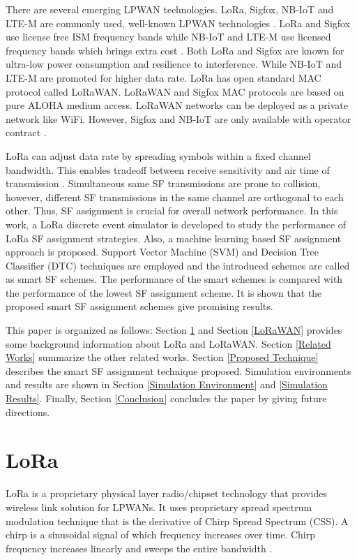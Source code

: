 \documentclass[conference]{IEEEtran}
\begin{document}
\par There are several emerging LPWAN technologies. LoRa, Sigfox, NB-IoT and LTE-M are commonly used, well-known LPWAN technologies \cite{7815384}. LoRa and Sigfox use license free ISM frequency bands while NB-IoT and LTE-M use licensed frequency bands which brings extra cost \cite{7815384}. Both LoRa and Sigfox are known for ultra-low power consumption and resilience to interference. While NB-IoT and LTE-M are promoted for higher data rate. LoRa has open standard MAC protocol called LoRaWAN. LoRaWAN and Sigfox MAC protocols are based on pure ALOHA medium access. LoRaWAN networks can be deployed as a private network like WiFi. However, Sigfox and NB-IoT are only available with operator contract \cite{7815384}.

\par LoRa can adjust data rate by spreading symbols within a fixed channel bandwidth. This enables tradeoff between receive sensitivity and air time of transmission \cite{7803607}. Simultaneous same SF transmissions are prone to collision, however, different SF transmissions in the same channel are orthogonal to each other. Thus, SF assignment is crucial for overall network performance. In this work, a LoRa discrete event simulator is developed to study the performance of LoRa SF assignment strategies. Also, a machine learning based SF assignment approach is proposed. Support Vector Machine (SVM) and Decision Tree Classifier (DTC) techniques are employed and the introduced schemes are called as smart SF schemes. The performance of the smart schemes is compared with the performance of the lowest SF assignment scheme. It is shown that the proposed smart SF assignment schemes give promising results.

\par This paper is organized as follows: Section \ref{LoRa} and Section \ref{LoRaWAN} provides some background information about LoRa and LoRaWAN. Section \ref{Related Works} summarize  the other related works. Section \ref{Proposed Technique} describes the smart SF assignment technique proposed. Simulation environments and results are shown in Section \ref{Simulation Environment} and \ref{Simulation Results}. Finally, Section \ref{Conclusion} concludes the paper by giving future directions.


\section{LoRa} \label{LoRa}
\par LoRa is a proprietary physical layer radio/chipset technology that provides wireless link solution for LPWANs. It uses proprietary spread spectrum modulation technique that is the derivative of Chirp Spread Spectrum (CSS). A chirp is a sinusoidal signal of which frequency increases over time. Chirp frequency increases linearly and sweeps the entire bandwidth \cite{AN1200.22}.
\end{document}
